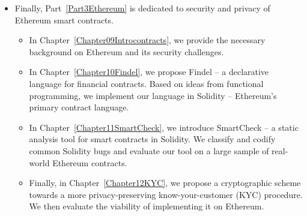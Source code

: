 \begin{itemize}
	\item
	Finally, Part~\ref{Part3Ethereum} is dedicated to security and privacy of Ethereum smart contracts.
	\begin{itemize}
		\item 
	In Chapter~\ref{Chapter09Introcontracts}, we provide the necessary background on Ethereum and its security challenges.
		\item
	In Chapter~\ref{Chapter10Findel}, we propose Findel -- a declarative language for financial contracts.
	Based on ideas from functional programming, we implement our language in Solidity -- Ethereum's primary contract language.
		\item
	In Chapter~\ref{Chapter11SmartCheck}, we introduce SmartCheck -- a static analysis tool for smart contracts in Solidity.
	We classify and codify common Solidity bugs and evaluate our tool on a large sample of real-world Ethereum contracts.
		\item
	Finally, in Chapter~\ref{Chapter12KYC}, we propose a cryptographic scheme towards a more privacy-preserving know-your-customer (KYC) procedure.
	We then evaluate the viability of implementing it on Ethereum.
	\end{itemize}
\end{itemize}













